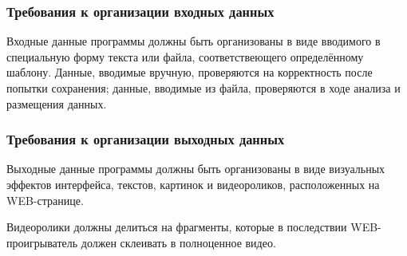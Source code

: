 \newpage

\subsubsection{Требования к организации входных данных}
Входные данные программы должны быть организованы в виде вводимого в специальную форму текста или файла,
соответствеющего определённому шаблону.
Данные, вводимые вручную, проверяются на корректность после попытки сохранения;
данные, вводимые из файла, проверяются в ходе анализа и размещения данных.

\subsubsection{Требования к организации выходных данных}
Выходные данные программы должны быть организованы в виде визуальных эффектов интерфейса, текстов, картинок и
видеороликов, расположенных на WEB-странице.

Видеоролики должны делиться на фрагменты, которые в последствии WEB-проигрыватель должен склеивать в полноценное видео.